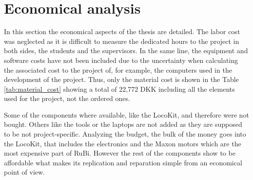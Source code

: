 \chapter{Economical analysis} %
\label{cha:economical_aspects}
In this section the economical aspects of the thesis are detailed.
The labor cost was neglected as it is difficult to measure the dedicated hours to the project in both sides, the students and the supervisors.
In the same line, the equipment and software costs have not been included due to the uncertainty when calculating the associated cost to the project of, for example, the computers used in the development of the project.
Thus, only the material cost is shown in the Table \ref{tab:material_cost} showing a total of 22,772 DKK including all the elements used for the project, not the ordered ones.

Some of the components where available, like the LocoKit, and therefore were not bought.
Others like the tools or the laptops are not added as they are supposed to be not project-specific.
Analyzing the budget, the bulk of the money goes into the LocoKit, that includes the electronics and the Maxon motors which are the most expensive part of RuBi.
However the rest of the components show to be affordable what makes its replication and reparation simple from an economical point of view.

